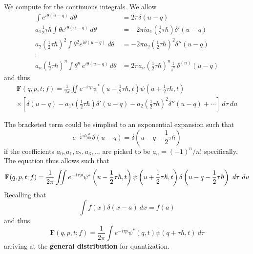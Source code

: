 \documentclass[a4paper]{article}
\begin{document}
	We compute for the continuous integrals. We allow
	\begin{align}
		\int e^{i\theta(u-q)}~d\theta&=2\pi\delta(u-q) \\
		a_1\frac{1}{2}\tau\hbar \int \theta e^{i\theta(u-q)}~d\theta&=-2\pi i a_1 \left(\frac{1}{2}\tau\hbar\right)\delta'(u-q) \\
		a_2\left(\frac{1}{2}\tau\hbar\right)^2 \int \theta^2e^{i\theta(u-q)}~d\theta&=-2\pi a_2\left(\frac{1}{2}\tau\hbar\right)^2\delta''(u-q) \\
		\vdots \\
		a_n\left(\frac{1}{2}\tau\hbar\right)^n\int \theta^n \, e^{i \theta (u-q)} \, d\theta&= 2\pi a_n\left(\frac{1}{2}\tau\hbar\right)^n \frac{1}{i^n} \, \delta^{(n)}(u-q)
	\end{align}
	and thus
	\begin{multline}
		\textbf{F}(q,p,t;f)=\frac{1}{2\pi}\iint e^{-i\tau p}\psi^*\left(u-\frac{1}{2}\tau\hbar,t\right)\psi\left(u+\frac{1}{2}\tau\hbar,t\right)\\\times\left[\delta(u-q)-a_1i\left(\frac{1}{2}\tau\hbar\right)\delta'(u-q)-a_2\left(\frac{1}{2}\tau\hbar\right)^2\delta''(u-q)+\cdots\right]~d\tau~du
	\end{multline}
	
	The bracketed term could be simplied to an exponential expansion such that
	\begin{equation}
		e^{-\frac{1}{2}\tau \hbar \frac{d}{du}} \delta(u - q)=\delta\left(u-q-\frac{1}{2}\tau\hbar\right)
	\end{equation}
	if the coefficients $a_0,a_1,a_2,a_3,\ldots$ are picked to be $a_n=(-1)^n/n!$ specifically. The equation thus allows such that
	\begin{equation}
		\textbf{F}(q,p,t;f)=\frac{1}{2\pi}\iint e^{-i\tau p}\psi^*\left(u-\frac{1}{2}\tau\hbar,t\right)\psi\left(u+\frac{1}{2}\tau\hbar,t\right)\\\delta\left(u-q-\frac{1}{2}\tau\hbar\right)~d\tau~du
	\end{equation}
	Recalling that
	\begin{equation}
		\int f(x)\delta(x-a)~dx=f(a)
	\end{equation}
	and thus
	\begin{equation}
		\boxed{\textbf{F}(q,p,t;f)=\frac{1}{2\pi}\int e^{-i\tau p}\psi^*\left(q,t\right)\psi\left(q+\tau\hbar,t\right)~d\tau}
	\end{equation}
	arriving at the \textbf{general distribution} for quantization.
\end{document}
